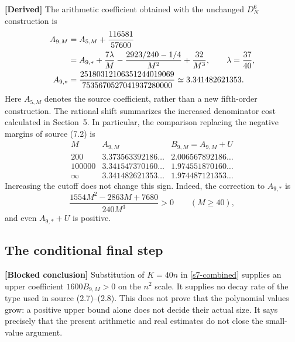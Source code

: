 \noindent\textbf{[Derived]} The arithmetic coefficient obtained with the
unchanged $D_N^6$ construction is
\begin{align}
 A_{9,M}&=A_{5,M}+\frac{116581}{57600}
 \notag\\
 &=A_{9,*}+\frac{7\lambda}{M}
       -\frac{2923/240-1/4}{M^2}+\frac{32}{M^3},
 \qquad \lambda=\frac{37}{40},
 \label{s7-arithmetic-coefficient}\\
 A_{9,*}&=\frac{25180312106351244019069}
                   {7535670527041937280000}
           \simeq3.341482621353.
 \label{s7-limit-coefficient}
\end{align}
Here $A_{5,M}$ denotes the source coefficient, rather than a new
fifth-order construction.  The rational shift summarizes the increased
denominator cost calculated in Section~5.  In particular, the comparison
replacing the negative margins of source (7.2) is
\begin{equation}
 \begin{array}{c|c|c}
 M&A_{9,M}&B_{9,M}=A_{9,M}+U\\ \hline
 200&3.373563392186\ldots&2.006567892186\ldots\\
 100000&3.341547370160\ldots&1.974551870160\ldots\\
 \infty&3.341482621353\ldots&1.974487121353\ldots
 \end{array}
 \label{s7-sign-table}
\end{equation}
Increasing the cutoff does not change this sign.  Indeed, the correction
to $A_{9,*}$ is
\[
 \frac{1554M^2-2863M+7680}{240M^3}>0\qquad(M\geq40),
\]
and even $A_{9,*}+U$ is positive.

\subsection{The conditional final step}
\label{s7-conditional-step}

\noindent\textbf{[Blocked conclusion]} Substitution of $K=40n$ in
\eqref{s7-combined} supplies an upper coefficient $1600B_{9,M}>0$ on
the $n^2$ scale.  It supplies no decay rate of the type used in source
(2.7)--(2.8).  This does not prove that the polynomial values grow: a
positive upper bound alone does not decide their actual size.  It says
precisely that the present arithmetic and real estimates do not close
the small-value argument.

